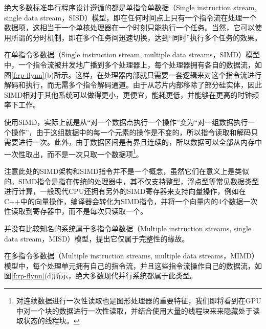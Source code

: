 绝大多数标准串行程序设计遵循的都是单指令单数据（Single instruction stream, single data stream，SISD）模型，即在任何时间点上只有一个指令流在处理一个数据项，这相当于一个单核处理器在一个时刻只能执行一个任务。当然，它可以使用所谓的分时机制，即在多个任务间迅速切换，达到“同时”执行多个任务的效果。

在单指令多数据（Single instruction stream, multiple data streams，SIMD）模型中，一个指令流被并发地广播到多个处理器上，每个处理器拥有各自的数据流，如图\ref{f:rp-flynn}(b)所示。这样，在处理器内部就只需要一套逻辑来对这个指令流进行解码和执行，而无需多个指令解码通道。由于从芯片内部移除了部分硅实体，因此SIMD相对于其他系统可以做得更小，更便宜，能耗更低，并能够在更高的时钟频率下工作。

使用SIMD，实际上就是从“对一个数据点执行一个操作”变为“对一组数据执行一个操作”，由于这组数据中的每一个元素的操作是不变的，所以指令读取和解码只需要进行一次。此外，由于数据区间是有界且连续的，所以数据可以全部从内存中一次性取出，而不是一次只取一个数据项\footnote{对连续数据进行一次性读取也是图形处理器的重要特征，我们即将看到在GPU中对一个块的数据进行一次性读取，并结合使用大量的线程块来来隐藏处于读取状态的线程块。}。

\begin{shaded*}
	注意此处的SIMD架构和SIMD指令并不是一个概念，虽然它们在意义上是类似的。SIMD指令是指在传统的处理器中，其不仅支持整型，浮点型等常见数据类型进行计算，一般现代CPU还拥有另外的SIMD寄存器来支持向量操作，例如在C++中的向量操作，编译器会转化为SIMD指令，并将一个向量内的4个数据一次性读取到寄存器中，而不是每次只读取一个。
\end{shaded*}

并没有比较知名的系统属于多指令单数据（Multiple instruction streams, single data stream，MISD）模型，提出它仅属于完整性的缘故。

在多指令多数据（Multiple instruction streams, multiple data streams，MIMD）模型中，每个处理单元拥有自己的指令流，并且这些指令流操作自己的数据流，如图\ref{f:rp-flynn}(d)所示，绝大多数现代并行系统都属于此类型。





